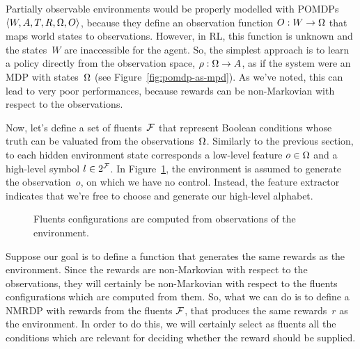 Partially observable environments would be properly modelled with POMDPs
$\langle W, A, T, R, \Omega, O\rangle$, because they define an observation
function $O: W \to \Omega$ that maps world states to observations. However, in
RL, this function is unknown and the states~$W$ are inaccessible for the
agent. So, the simplest approach is to learn a policy directly from the
observation space, $\rho: \Omega \to A$, as if the system were an MDP with
states~$\Omega$ (see Figure~\vref{fig:pomdp-as-mpd}). As we've noted, this can
lead to very poor performances, because rewards can be non-Markovian with
respect to the observations.

Now, let's define a set of fluents~$\mathcal{F}$ that represent Boolean
conditions whose truth can be valuated from the observations~$\Omega$.
Similarly to the previous section, to each hidden environment state
corresponds a low-level feature $o \in \Omega$ and a high-level symbol $l \in
2^{\mathcal{F}}$.  In Figure~\ref{fig:symbols-partial-obs}, the environment is
assumed to generate the observation~$o$, on which we have no control. Instead,
the feature extractor indicates that we're free to choose and generate our
high-level alphabet.
\begin{figure}
	\centering
	\caption{Fluents configurations are computed from observations of the
	environment.}
	\label{fig:symbols-partial-obs}
\end{figure}

Suppose our goal is to define a function that generates the same rewards as
the environment. Since the rewards are non-Markovian with respect to the
observations, they will certainly be non-Markovian with respect to the fluents
configurations which are computed from them. So, what we can do is to define a
NMRDP with \ldl{} rewards from the fluents $\mathcal{F}$, that produces the same
rewards~$r$ as the environment. In order to do this, we will certainly select
as fluents all the conditions which are relevant for deciding whether the
reward should be supplied.

